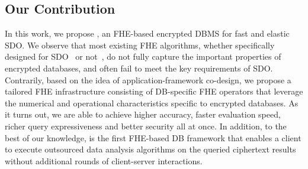 \subsection{Our Contribution}
In this work, we propose \NAME, 
an FHE-based encrypted DBMS for fast and elastic SDO. 
We observe that most existing FHE algorithms, 
whether specifically designed for SDO~\cite{heda} or not~\cite{pegasus,ckkscomparison}, 
do not fully capture the important properties of encrypted databases,
and often fail to meet the key requirements of SDO.
Contrarily, based on the idea of application-framework co-design, 
we propose a tailored FHE infrastructure consisting of DB-specific
FHE operators that leverage the numerical and operational characteristics
specific to encrypted databases. As it turns out, we are able to
achieve higher accuracy, faster evaluation speed, richer query expressiveness
and better security all at once.
In addition, to the best of our knowledge,
\NAME is the first FHE-based DB framework that enables a client to
execute outsourced data analysis algorithms on the queried ciphertext results 
without additional rounds of client-server 
interactions.



